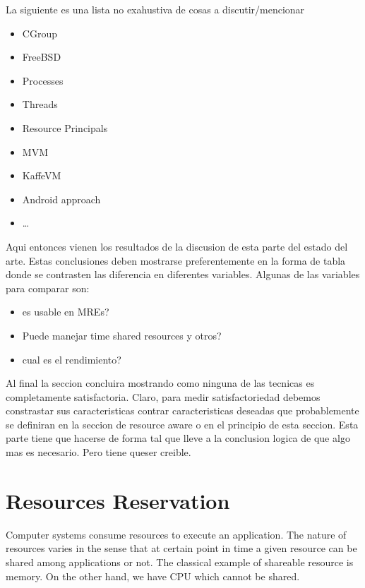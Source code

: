 La siguiente es una lista no exahustiva de cosas a discutir/mencionar

\begin{itemize}
\item CGroup
\item FreeBSD
\item Processes
\item Threads
\item Resource Principals
\item MVM
\item KaffeVM
\item Android approach
\item \dots
\end{itemize}

Aqui entonces vienen los resultados de la discusion de esta parte del estado del arte.
Estas conclusiones deben mostrarse preferentemente en la forma de tabla donde se contrasten las diferencia en diferentes variables. Algunas de las variables para comparar son:

\begin{itemize}
\item es usable en MREs?
\item Puede manejar time shared resources y otros?
\item cual es el rendimiento?
\end{itemize}

Al final la seccion concluira mostrando como ninguna de las tecnicas es completamente satisfactoria. Claro, para medir satisfactoriedad debemos constrastar sus caracteristicas contrar caracteristicas deseadas que probablemente se definiran en la seccion de resource aware o en el principio de esta seccion. Esta parte tiene que hacerse de forma tal que lleve a la conclusion logica de que algo mas es necesario. Pero tiene queser creible.


%

\section{Resources Reservation}
Computer systems consume resources to execute an application.
The nature of resources varies in the sense that at certain point in time a given resource can be shared among applications or not.
The classical example of shareable resource is memory.
On the other hand, we have CPU which cannot be shared.

